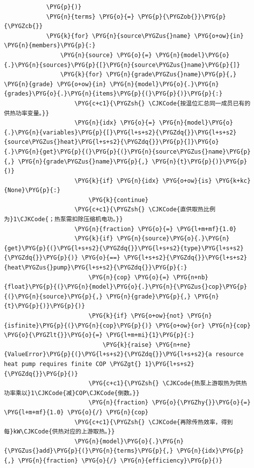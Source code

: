 \begin{Verbatim}
            \PYG{p}{)}
            \PYG{n}{terms} \PYG{o}{=} \PYG{p}{\PYGZob{}}\PYG{p}{\PYGZcb{}}
            \PYG{k}{for} \PYG{n}{source\PYGZus{}name} \PYG{o+ow}{in} \PYG{n}{members}\PYG{p}{:}
                \PYG{n}{source} \PYG{o}{=} \PYG{n}{model}\PYG{o}{.}\PYG{n}{sources}\PYG{p}{[}\PYG{n}{source\PYGZus{}name}\PYG{p}{]}
                \PYG{k}{for} \PYG{n}{grade\PYGZus{}name}\PYG{p}{,} \PYG{n}{grade} \PYG{o+ow}{in} \PYG{n}{model}\PYG{o}{.}\PYG{n}{grades}\PYG{o}{.}\PYG{n}{items}\PYG{p}{(}\PYG{p}{)}\PYG{p}{:}
                    \PYG{c+c1}{\PYGZsh{} \CJKCode{按温位汇总同一成员已有的供热功率变量。}}
                    \PYG{n}{idx} \PYG{o}{=} \PYG{n}{model}\PYG{o}{.}\PYG{n}{variables}\PYG{p}{[}\PYG{l+s+s2}{\PYGZdq{}}\PYG{l+s+s2}{source\PYGZus{}heat}\PYG{l+s+s2}{\PYGZdq{}}\PYG{p}{]}\PYG{o}{.}\PYG{n}{get}\PYG{p}{(}\PYG{p}{(}\PYG{n}{source\PYGZus{}name}\PYG{p}{,} \PYG{n}{grade\PYGZus{}name}\PYG{p}{,} \PYG{n}{t}\PYG{p}{)}\PYG{p}{)}
                    \PYG{k}{if} \PYG{n}{idx} \PYG{o+ow}{is} \PYG{k+kc}{None}\PYG{p}{:}
                        \PYG{k}{continue}
                    \PYG{c+c1}{\PYGZsh{} \CJKCode{直供取热比例为}1\CJKCode{；热泵需扣除压缩机电功。}}
                    \PYG{n}{fraction} \PYG{o}{=} \PYG{l+m+mf}{1.0}
                    \PYG{k}{if} \PYG{n}{source}\PYG{o}{.}\PYG{n}{get}\PYG{p}{(}\PYG{l+s+s2}{\PYGZdq{}}\PYG{l+s+s2}{type}\PYG{l+s+s2}{\PYGZdq{}}\PYG{p}{)} \PYG{o}{==} \PYG{l+s+s2}{\PYGZdq{}}\PYG{l+s+s2}{heat\PYGZus{}pump}\PYG{l+s+s2}{\PYGZdq{}}\PYG{p}{:}
                        \PYG{n}{cop} \PYG{o}{=} \PYG{n+nb}{float}\PYG{p}{(}\PYG{n}{model}\PYG{o}{.}\PYG{n}{\PYGZus{}cop}\PYG{p}{(}\PYG{n}{source}\PYG{p}{,} \PYG{n}{grade}\PYG{p}{,} \PYG{n}{t}\PYG{p}{)}\PYG{p}{)}
                        \PYG{k}{if} \PYG{o+ow}{not} \PYG{n}{isfinite}\PYG{p}{(}\PYG{n}{cop}\PYG{p}{)} \PYG{o+ow}{or} \PYG{n}{cop} \PYG{o}{\PYGZlt{}}\PYG{o}{=} \PYG{l+m+mi}{1}\PYG{p}{:}
                            \PYG{k}{raise} \PYG{n+ne}{ValueError}\PYG{p}{(}\PYG{l+s+s2}{\PYGZdq{}}\PYG{l+s+s2}{a resource heat pump requires finite COP \PYGZgt{} 1}\PYG{l+s+s2}{\PYGZdq{}}\PYG{p}{)}
                        \PYG{c+c1}{\PYGZsh{} \CJKCode{热泵上游取热为供热功率乘以}1\CJKCode{减}COP\CJKCode{倒数。}}
                        \PYG{n}{fraction} \PYG{o}{\PYGZhy{}}\PYG{o}{=} \PYG{l+m+mf}{1.0} \PYG{o}{/} \PYG{n}{cop}
                    \PYG{c+c1}{\PYGZsh{} \CJKCode{再除传热效率，得到每}kW\CJKCode{供热对应的上游取热。}}
                    \PYG{n}{model}\PYG{o}{.}\PYG{n}{\PYGZus{}add}\PYG{p}{(}\PYG{n}{terms}\PYG{p}{,} \PYG{n}{idx}\PYG{p}{,} \PYG{n}{fraction} \PYG{o}{/} \PYG{n}{efficiency}\PYG{p}{)}

\end{Verbatim}
